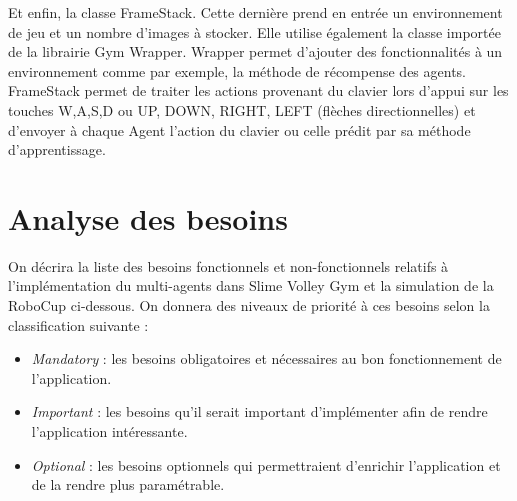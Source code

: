 \documentclass[11pt, a4paper]{article}
\begin{document}
Et enfin, la classe FrameStack. Cette dernière prend en entrée un environnement de jeu et un nombre d'images à stocker. Elle utilise également la classe importée de la librairie Gym Wrapper. Wrapper permet d'ajouter des fonctionnalités à un environnement comme par exemple, la méthode de récompense des agents. FrameStack permet de traiter les actions provenant du clavier lors d'appui sur les touches W,A,S,D ou UP, DOWN, RIGHT, LEFT (flèches directionnelles) et d'envoyer à chaque Agent l'action du clavier ou celle prédit par sa méthode d'apprentissage.


\section{Analyse des besoins}
On décrira la liste des besoins fonctionnels et non-fonctionnels relatifs à l'implémentation du multi-agents dans Slime Volley Gym et la simulation de la RoboCup ci-dessous. On donnera des niveaux de priorité à ces besoins selon la classification suivante : 
\begin{itemize}
\item \textit{Mandatory} : les besoins obligatoires et nécessaires au bon fonctionnement de l'application.
\item \textit{Important} : les besoins qu'il serait important d'implémenter afin de rendre l'application intéressante. 
\item \textit{Optional} : les besoins optionnels qui permettraient d'enrichir l'application et de la rendre plus paramétrable.
\end{itemize}
\end{document}
